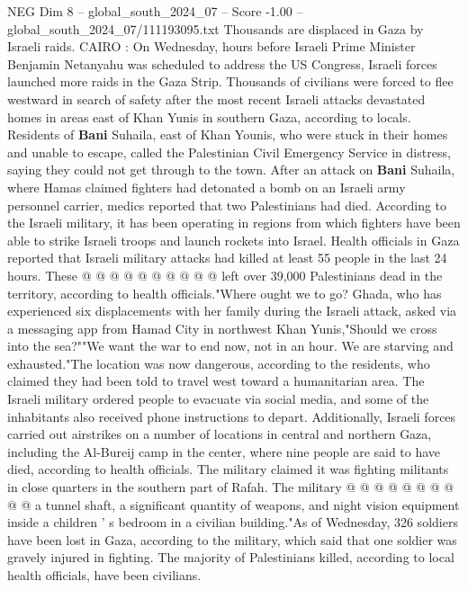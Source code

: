 \begin{textsample}{NEG Dim 8 – global\_south\_2024\_07 – Score -1.00 – global\_south\_2024\_07/111193095.txt}  \label{ex:f8_neg_352}
Thousands are displaced in Gaza by Israeli raids.
CAIRO : On Wednesday, hours before Israeli Prime Minister Benjamin Netanyahu was scheduled to address the US Congress, Israeli forces launched more raids in the Gaza Strip.
Thousands of civilians were forced to flee westward in search of safety after the most recent Israeli attacks devastated homes in areas east of Khan Yunis in southern Gaza, according to locals.
Residents of \textbf{Bani} Suhaila, east of Khan Younis, who were stuck in their homes and unable to escape, called the Palestinian Civil Emergency Service in distress, saying they could not get through to the town.
After an attack on \textbf{Bani} Suhaila, where Hamas claimed fighters had detonated a bomb on an Israeli army personnel carrier, medics reported that two Palestinians had died.
According to the Israeli military, it has been operating in regions from which fighters have been able to strike Israeli troops and launch rockets into Israel.
Health officials in Gaza reported that Israeli military attacks had killed at least 55 people in the last 24 hours.
These @ @ @ @ @ @ @ @ @ @ left over 39,000 Palestinians dead in the territory, according to health officials."Where ought we to go?
Ghada, who has experienced six displacements with her family during the Israeli attack, asked via a messaging app from Hamad City in northwest Khan Yunis,"Should we cross into the sea?""We want the war to end now, not in an hour.
We are starving and exhausted."The location was now dangerous, according to the residents, who claimed they had been told to travel west toward a humanitarian area.
The Israeli military ordered people to evacuate via social media, and some of the inhabitants also received phone instructions to depart.
Additionally, Israeli forces carried out airstrikes on a number of locations in central and northern Gaza, including the Al-Bureij camp in the center, where nine people are said to have died, according to health officials.
The military claimed it was fighting militants in close quarters in the southern part of Rafah.
The military @ @ @ @ @ @ @ @ @ @ a tunnel shaft, a significant quantity of weapons, and night vision equipment inside a children ' s bedroom in a civilian building."As of Wednesday, 326 soldiers have been lost in Gaza, according to the military, which said that one soldier was gravely injured in fighting.
The majority of Palestinians killed, according to local health officials, have been civilians.

\end{textsample}
